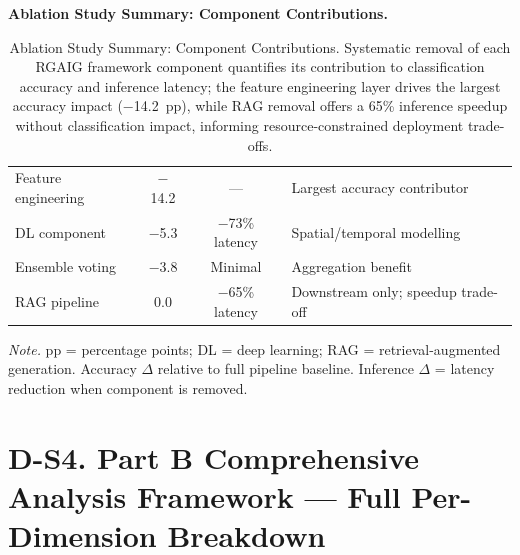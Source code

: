 \noindent\textbf{Ablation Study Summary: Component Contributions.}

\begin{table}[!htbp]
\tablestripes\tablefontsize
\caption[Ablation Study Summary: Component Contributions]{Ablation Study Summary: Component Contributions. Systematic removal of each RGAIG framework component quantifies its contribution to classification accuracy and inference latency; the feature engineering layer drives the largest accuracy impact ($-$14.2~pp), while RAG removal offers a 65\% inference speedup without classification impact, informing resource-constrained deployment trade-offs.}
\tablefontsize
\begin{tabularx}{\textwidth}{@{} L C C L @{}}
\toprule
{} &  &  &  \\
\midrule
Feature engineering & $-$14.2 & --- & Largest accuracy contributor \\
DL component & $-$5.3 & $-$73\% latency & Spatial/temporal modelling \\
Ensemble voting & $-$3.8 & Minimal & Aggregation benefit \\
RAG pipeline & 0.0 & $-$65\% latency & Downstream only; speedup trade-off \\
\bottomrule
\end{tabularx}
\vspace{0.5em}\noindent\textit{Note.} pp = percentage points; DL = deep learning; RAG = retrieval-augmented generation. Accuracy $\Delta$ relative to full pipeline baseline. Inference $\Delta$ = latency reduction when component is removed.
\end{table}

\section*{D-S4. Part B Comprehensive Analysis Framework --- Full Per-Dimension Breakdown}
\label{sec:appd_partb_comprehensive_full}

